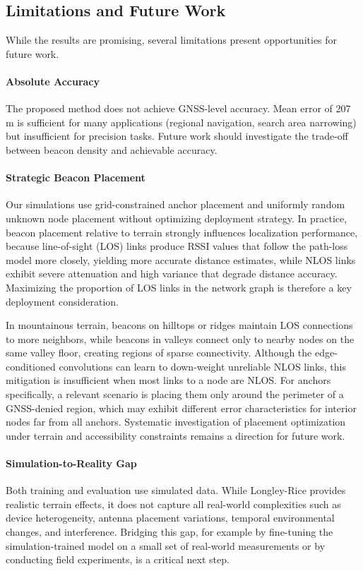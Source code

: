 \documentclass{ieeeaccess}
\begin{document}
\subsection{Limitations and Future Work}
While the results are promising, several limitations present opportunities for future work.

\paragraph{Absolute Accuracy}
The proposed method does not achieve GNSS-level accuracy. Mean error of 207 m is sufficient for many applications (regional navigation, search area narrowing) but insufficient for precision tasks. Future work should investigate the trade-off between beacon density and achievable accuracy.

\paragraph{Strategic Beacon Placement}
Our simulations use grid-constrained anchor placement and uniformly random unknown node placement without optimizing deployment strategy. In practice, beacon placement relative to terrain strongly influences localization performance, because line-of-sight (LOS) links produce RSSI values that follow the path-loss model more closely, yielding more accurate distance estimates, while NLOS links exhibit severe attenuation and high variance that degrade distance accuracy. Maximizing the proportion of LOS links in the network graph is therefore a key deployment consideration.

In mountainous terrain, beacons on hilltops or ridges maintain LOS connections to more neighbors, while beacons in valleys connect only to nearby nodes on the same valley floor, creating regions of sparse connectivity. Although the edge-conditioned convolutions can learn to down-weight unreliable NLOS links, this mitigation is insufficient when most links to a node are NLOS. For anchors specifically, a relevant scenario is placing them only around the perimeter of a GNSS-denied region, which may exhibit different error characteristics for interior nodes far from all anchors. Systematic investigation of placement optimization under terrain and accessibility constraints remains a direction for future work.

\paragraph{Simulation-to-Reality Gap}
Both training and evaluation use simulated data. While Longley-Rice provides realistic terrain effects, it does not capture all real-world complexities such as device heterogeneity, antenna placement variations, temporal environmental changes, and interference. Bridging this gap, for example by fine-tuning the simulation-trained model on a small set of real-world measurements or by conducting field experiments, is a critical next step.
\end{document}
